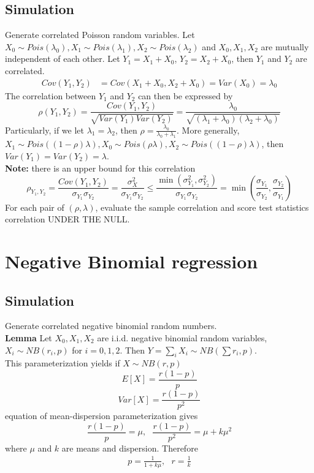 \documentclass[12pt,oneside]{book}
\begin{document}
\subsection*{Simulation}
Generate correlated Poisson random variables. Let $X_0\sim Pois(\lambda_0), X_1 \sim Pois(\lambda_1), X_2\sim Pois(\lambda_2)$ and $X_0, X_1, X_2$ are mutually independent of each other. Let $Y_1= X_1 + X_0$, $Y_2= X_2 + X_0$, then $Y_1$ and $Y_2$ are correlated. 
\begin{align*}
Cov(Y_1, Y_2) &= Cov(X_1+X_0, X_2 + X_0) = Var(X_0) = \lambda_0
\end{align*}
The correlation between $Y_1$ and $Y_2$ can then be expressed by 
\[\rho(Y_1, Y_2) = \frac{Cov(Y_1, Y_2)}{\sqrt{Var(Y_1) Var(Y_2)}} = \frac{\lambda_0}{\sqrt{(\lambda_1 + \lambda_0)(\lambda_2 + \lambda_0)}}\]
Particularly, if we let $\lambda_1 = \lambda_2$, then $\rho = \frac{\lambda_0}{\lambda_0 + \lambda_1}$. More generally, $X_1\sim Pois((1-\rho) \lambda), X_0\sim Pois(\rho\lambda), X_2\sim Pois((1-\rho)\lambda)$,  then $Var(Y_1) = Var(Y_2) = \lambda$.  \\

\textbf{Note:} there is an upper bound for this correlation
\[\rho_{Y_1,Y_2}= \frac{Cov(Y_1, Y_2)}{\sigma_{Y_1}\sigma_{Y_2}} = \frac{\sigma_X^2}{\sigma_{Y_1}\sigma_{Y_2}} \leq \frac{\min (\sigma^2_{Y_1}, \sigma^2_{Y_2}) }{\sigma_{Y_1}\sigma_{Y_2}} = \min \left(
\frac{\sigma_{Y_1}}{\sigma_{Y_2}},\frac{\sigma_{Y_2}}{\sigma_{Y_1}} \right)\]
For each pair of $(\rho, \lambda)$, evaluate the sample correlation and score test statistics correlation UNDER THE NULL. 


\section*{Negative Binomial regression}

\subsection*{Simulation}
Generate correlated negative binomial random numbers. \\

\textbf{Lemma}   Let $X_0, X_1, X_2$ are i.i.d. negative binomial random variables, $X_i \sim NB(r_i, p)$ for $i=0, 1, 2$. Then $Y = \sum_i X_i \sim NB(\sum r_i,  p)$.  \\

This parameterization yields if $X\sim NB(r, p)$
\[E[X] = \frac{r(1-p)}{p} \]
\[Var[X] = \frac{r(1-p)}{p^2}\]
equation of mean-dispersion parameterization gives 
\[\frac{r(1-p)}{p} = \mu,  ~~~ \frac{r(1-p)}{p^2} = \mu + k\mu^2\]
where $\mu$ and $k$ are means and dispersion. Therefore
\begin{align} \label{NBparam}
p = \frac{1}{1 + k\mu}, ~~~ r = \frac{1}{k}
\end{align}
\end{document}
